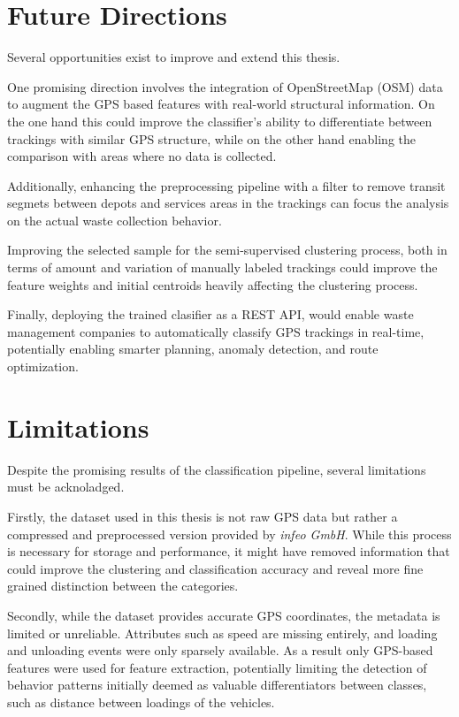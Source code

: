 \documentclass[a4paper,12pt,twoside]{scrreprt}
\begin{document}
\section{Future Directions}

Several opportunities exist to improve and extend this thesis.

One promising direction involves the integration of OpenStreetMap (OSM) data to
augment the GPS based features with real-world structural information. On the
one hand this could improve the classifier's ability to differentiate between
trackings with similar GPS structure, while on the other hand enabling the
comparison with areas where no data is collected.

Additionally, enhancing the preprocessing pipeline with a filter to remove
transit segmets between depots and services areas in the trackings can focus
the
analysis on the actual waste collection behavior.

Improving the selected sample for the semi-supervised clustering process, both
in terms of amount and variation of manually labeled trackings
could improve the feature weights and initial centroids heavily affecting the
clustering process.

Finally, deploying the trained clasifier as a REST API, would enable
waste management companies to automatically classify GPS trackings in
real-time,
potentially enabling smarter planning, anomaly detection, and route
optimization.

\section{Limitations}

Despite the promising results of the classification pipeline, several
limitations must be acknoladged.

Firstly, the dataset used in this thesis is not raw GPS data but rather a
compressed and preprocessed version provided by \textit{infeo GmbH}.
While this process is necessary for storage and performance, it might have
removed information that could improve the clustering and classification
accuracy and reveal more fine grained distinction between the categories.

Secondly, while the dataset provides accurate GPS coordinates, the metadata is
limited or unreliable. Attributes such as speed are missing entirely, and
loading and
unloading events were only sparsely available. As a result only GPS-based
features
were used for feature extraction, potentially limiting the detection of
behavior patterns
initially deemed as valuable differentiators between classes, such as distance
between loadings of the vehicles.
\end{document}
